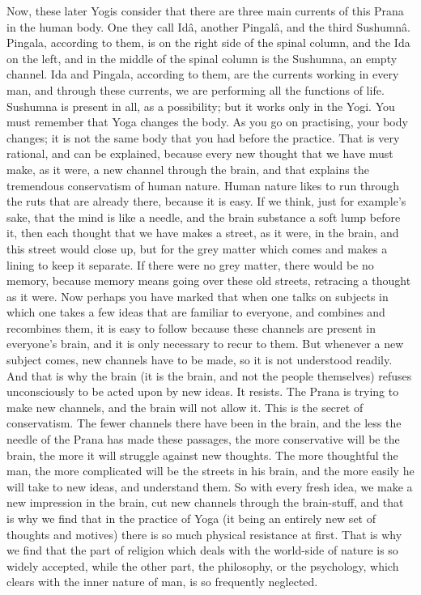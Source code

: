 Now, these later Yogis consider that there are three main
currents of this Prana in the human body. One they call Idâ, another
Pingalâ, and the third Sushumnâ. Pingala, according to them, is on the
right side of the spinal column, and the Ida on the left, and in the
middle of the spinal column is the Sushumna, an empty channel. Ida and
Pingala, according to them, are the currents working in every man, and
through these currents, we are performing all the functions of life.
Sushumna is present in all, as a possibility; but it works only in the
Yogi. You must remember that Yoga changes the body. As you go on
practising, your body changes; it is not the same body that you had
before the practice. That is very rational, and can be explained,
because every new thought that we have must make, as it were, a new
channel through the brain, and that explains the tremendous
conservatism of human nature. Human nature likes to run through the
ruts that are already there, because it is easy. If we think, just for
example's sake, that the mind is like a needle, and the brain substance
a soft lump before it, then each thought that we have makes a street,
as it were, in the brain, and this street would close up, but for the
grey matter which comes and makes a lining to keep it separate. If
there were no grey matter, there would be no memory, because memory
means going over these old streets, retracing a thought as it were. Now
perhaps you have marked that when one talks on subjects in which one
takes a few ideas that are familiar to everyone, and combines and
recombines them, it is easy to follow because these channels are
present in everyone's brain, and it is only necessary to recur to them.
But whenever a new subject comes, new channels have to be made, so it
is not understood readily. And that is why the brain (it is the brain,
and not the people themselves) refuses unconsciously to be acted upon
by new ideas. It resists. The Prana is trying to make new channels, and
the brain will not allow it. This is the secret of conservatism. The
fewer channels there have been in the brain, and the less the needle of
the Prana has made these passages, the more conservative will be the
brain, the more it will struggle against new thoughts. The more
thoughtful the man, the more complicated will be the streets in his
brain, and the more easily he will take to new ideas, and understand
them. So with every fresh idea, we make a new impression in the brain,
cut new channels through the brain-stuff, and that is why we find that
in the practice of Yoga (it being an entirely new set of thoughts and
motives) there is so much physical resistance at first. That is why we
find that the part of religion which deals with the world-side of
nature is so widely accepted, while the other part, the philosophy, or
the psychology, which clears with the inner nature of man, is so
frequently neglected. \\

